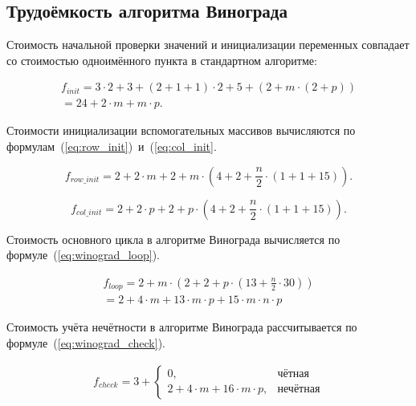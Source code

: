 \subsection{Трудоёмкость алгоритма Винограда}

Стоимость начальной проверки значений и инициализации переменных совпадает со стоимостью одноимённого пункта в стандартном алгоритме:

\begin{equation}
    \label{eq:winograd_init}
    \begin{gathered}
        f_{init} = 3 \cdot 2 + 3 + (2 + 1 + 1) \cdot 2 + 5 + (2 + m \cdot (2 + p)) \\
        = 24 + 2 \cdot m + m \cdot p.
    \end{gathered} 
\end{equation}

Стоимости инициализации вспомогательных массивов вычисляются по формулам~(\ref{eq:row_init})~и~(\ref{eq:col_init}.

\begin{equation}
    \label{eq:row_init}
    f_{row\_init} = 2 + 2 \cdot m + 2 + m \cdot (4 + 2 + \frac{n}{2} \cdot (1 + 1 + 15)).
\end{equation}

\begin{equation}
    \label{eq:col_init}
    f_{col\_init} = 2 + 2 \cdot p + 2 + p \cdot (4 + 2 + \frac{n}{2} \cdot (1 + 1 + 15)).
\end{equation}

Стоимость основного цикла в алгоритме Винограда вычисляется по формуле~(\ref{eq:winograd_loop}).

\begin{equation}
    \label{eq:winograd_loop}
    \begin{gathered}
        f_{loop} = 2 + m \cdot (2 + 2 + p \cdot (13 + \frac{n}{2} \cdot 30)) \\
        = 2 + 4 \cdot m + 13 \cdot m \cdot p + 15 \cdot m \cdot n \cdot p
    \end{gathered}
\end{equation}

Стоимость учёта нечётности в алгоритме Винограда рассчитывается по формуле~(\ref{eq:winograd_check}).

\begin{equation}
    \label{eq:winograd_check}
    \begin{gathered}
        f_{check} = 3 + \begin{cases}
            0, & \text{чётная} \\
            2 + 4 \cdot m + 16 \cdot m \cdot p, & \text{нечётная}
        \end{cases}
    \end{gathered}
\end{equation}

